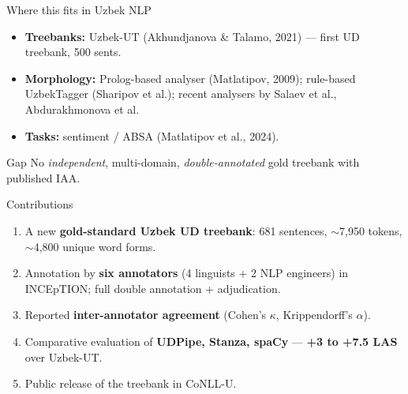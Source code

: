 \documentclass[10pt,aspectratio=169]{beamer}
\begin{document}
\begin{frame}{Where this fits in Uzbek NLP}
   \begin{itemize}
     \item \textbf{Treebanks:} Uzbek-UT (Akhundjanova \& Talamo, 2021) — first UD treebank, 500 sents.
     \item \textbf{Morphology:} Prolog-based analyser (Matlatipov, 2009); rule-based UzbekTagger (Sharipov et al.); recent analysers by Salaev et al., Abdurakhmonova et al.
     \item \textbf{Tasks:} sentiment / ABSA (Matlatipov et al., 2024).
   \end{itemize}
   \vspace{0.4em}
   \begin{alertblock}{Gap}
     No \emph{independent}, multi-domain, \emph{double-annotated} gold treebank with published IAA.
   \end{alertblock}
\end{frame}

\begin{frame}{Contributions}
   \begin{enumerate}
     \item A new \textbf{gold-standard Uzbek UD treebank}: 681 sentences, $\sim$7{,}950 tokens, $\sim$4{,}800 unique word forms.
     \item Annotation by \textbf{six annotators} (4 linguists + 2 NLP engineers) in INCEpTION; full double annotation + adjudication.
     \item Reported \textbf{inter-annotator agreement} (Cohen's $\kappa$, Krippendorff's $\alpha$).
     \item Comparative evaluation of \textbf{UDPipe, Stanza, spaCy} — \textbf{+3 to +7.5 LAS} over Uzbek-UT.
     \item Public release of the treebank in CoNLL-U.
   \end{enumerate}
\end{frame}

\end{document}
